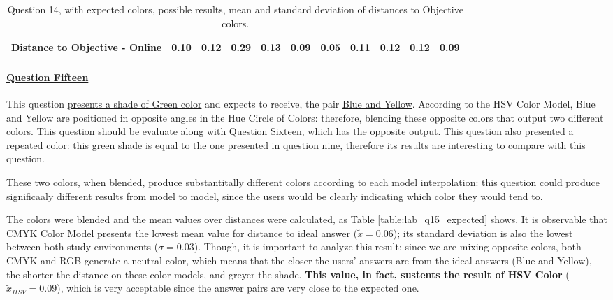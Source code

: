 \begin{table}[H]
{\begin{tabular}{lccccccccccccc}
    \multicolumn{4}{l}{Distance to Objective - Online}                                                                                               & \multicolumn{1}{|c}{0.10}        & \multicolumn{1}{c|}{0.12}    & \multicolumn{1}{|c}{0.29}        & \multicolumn{1}{c|}{0.13}    & \multicolumn{1}{|c}{\textbf{0.09}}       & \multicolumn{1}{c|}{0.05}    & \multicolumn{1}{|c}{0.11}        & \multicolumn{1}{c|}{0.12}    & \multicolumn{1}{|c}{0.12}       & \multicolumn{1}{c|}{0.09}    \\ \hline
    \end{tabular}}
  \caption[Question 14, with expected Results.]{Question 14, with expected colors, possible results, mean and standard deviation of distances to Objective colors.}
  \label{table:lab_q14_expected}
\end{table}
%
\paragraph{\ul{Question Fifteen}}
%
This question \ul{presents a shade of Green color} and expects to receive, the pair \ul{Blue and Yellow}. According to the HSV Color Model, Blue and Yellow are positioned in
opposite angles in the Hue Circle of Colors: therefore, blending these opposite colors that output two different colors. This question should be evaluate along with Question Sixteen, which has
the opposite output. This question also presented a repeated color: this green shade is equal to the one presented in question nine, therefore its results are interesting to compare with this question.\par
%
These two colors, when blended, produce substantitally different colors according to each model interpolation: this question could produce significaaly different results from model to model,
since the users would be clearly indicating which color they would tend to. \par
%
The colors were blended and the mean values over distances were calculated, as Table \ref{table:lab_q15_expected} shows. It is observable that CMYK Color Model presents the lowest mean value
for distance to ideal answer ($\tilde{x} = 0.06$); its standard deviation is also the lowest between both study environments ($\sigma = 0.03$). Though, it is important to analyze this result: since we
are mixing opposite colors, both CMYK and RGB generate a neutral color, which means that the closer the users' answers are from the ideal answers (Blue and Yellow), the shorter the distance on these color
models, and greyer the shade. \textbf{This value, in fact, sustents the result of HSV Color} ($\tilde{x}_{HSV} = 0.09$), which is very acceptable since the answer pairs are very close to the expected one. \par
